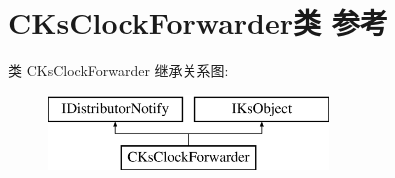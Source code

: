 \hypertarget{class_c_ks_clock_forwarder}{}\section{C\+Ks\+Clock\+Forwarder类 参考}
\label{class_c_ks_clock_forwarder}
类 C\+Ks\+Clock\+Forwarder 继承关系图\+:\begin{figure}[H]
\begin{center}
\leavevmode
\includegraphics[height=2.000000cm]{class_c_ks_clock_forwarder}
\end{center}
\end{figure}
